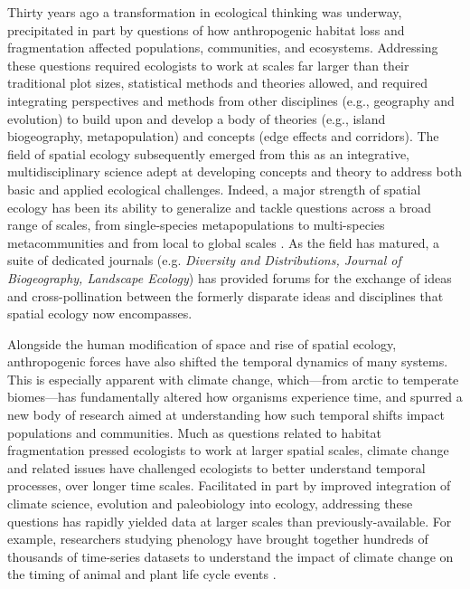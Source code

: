 \documentclass[11pt,a4paper,oneside]{article}
\begin{document}
\newpage
\linenumbers

Thirty years ago a transformation in ecological thinking was underway, precipitated in part by questions of how anthropogenic habitat loss and fragmentation affected populations, communities, and ecosystems. Addressing these questions required ecologists to work at scales far larger than their traditional plot sizes, statistical methods and theories allowed, and required integrating perspectives and methods from other disciplines (e.g., geography and evolution) to build upon and develop a body of theories (e.g., island biogeography, metapopulation) and concepts (edge effects and corridors). The field of spatial ecology subsequently emerged from this as an integrative, multidisciplinary science adept at developing concepts and theory to address both basic and applied ecological challenges. Indeed, a major strength of spatial ecology has been its ability to generalize and tackle questions across a broad range of scales, from single-species metapopulations to multi-species metacommunities \citep{Pillai2011} and from local to global scales \citep{bell2001}. As the field has matured, a suite of dedicated journals  (e.g. \emph{Diversity and Distributions, Journal of Biogeography, Landscape Ecology}) has provided forums for the exchange of ideas and cross-pollination between the formerly disparate ideas and disciplines that spatial ecology now encompasses. 

Alongside the human modification of space and rise of spatial ecology, anthropogenic forces have also shifted the temporal dynamics of many systems. This is especially apparent with climate change, which---from arctic to temperate biomes---has fundamentally altered how organisms experience time, and spurred a new body of research aimed at understanding how such temporal shifts impact populations and communities. Much as questions related to habitat fragmentation pressed ecologists to work at larger spatial scales, climate change and related issues have challenged ecologists to better understand temporal processes, over longer time scales. Facilitated in part by improved integration of climate science, evolution and paleobiology into ecology, addressing these questions has rapidly yielded data at larger scales than previously-available. For example, researchers studying phenology have brought together hundreds of thousands of time-series datasets to understand the impact of climate change on the timing of animal and plant life cycle events \citep{Menzel:2006sq}. 
\end{document}
